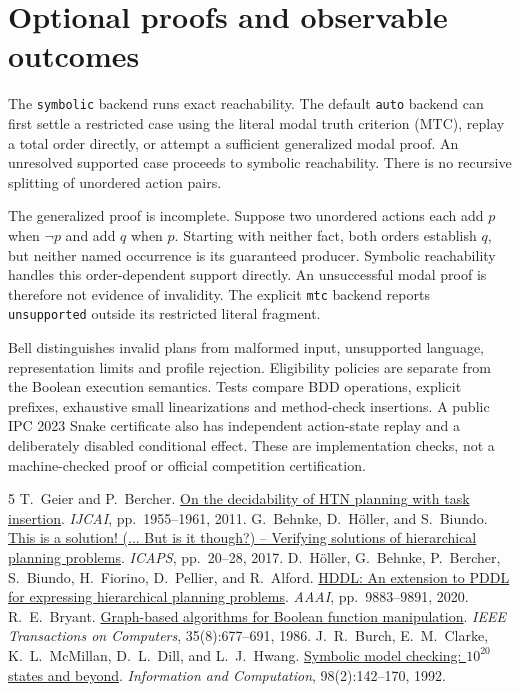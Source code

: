 \documentclass[10pt,a4paper,twocolumn]{article}
\begin{document}
\section{Optional proofs and observable outcomes}
The \texttt{symbolic} backend runs exact reachability. The default \texttt{auto}
backend can first settle a restricted case using the literal modal truth criterion
(MTC), replay a total order directly, or attempt a sufficient generalized modal proof. An unresolved supported
case proceeds to symbolic reachability. There is no recursive splitting of
unordered action pairs.

The generalized proof is incomplete. Suppose two unordered actions each add $p$
when $\neg p$ and add $q$ when $p$. Starting with neither fact, both orders
establish $q$, but neither named occurrence is its guaranteed producer. Symbolic
reachability handles this order-dependent support directly. An unsuccessful
modal proof is therefore not evidence of invalidity. The explicit \texttt{mtc}
backend reports \texttt{unsupported} outside its restricted literal fragment.

Bell distinguishes invalid plans from malformed input, unsupported language,
representation limits and profile rejection. Eligibility policies are separate
from the Boolean execution semantics. Tests compare BDD operations, explicit
prefixes, exhaustive small linearizations and method-check insertions.
A public IPC 2023 Snake certificate also has independent action-state replay
and a deliberately disabled conditional effect. These are implementation checks,
not a machine-checked proof or official competition certification.

\begin{thebibliography}{5}
\small\setlength{\itemsep}{1pt}
 T.~Geier and P.~Bercher.
\href{https://bercher.net/publications/2011/Geier2011TIHTNDecidability.pdf}{On the decidability of HTN planning with task insertion}.
\emph{IJCAI}, pp.~1955--1961, 2011.
 G.~Behnke, D.~H\"oller, and S.~Biundo.
\href{https://doi.org/10.1609/icaps.v27i1.13811}{This is a solution! (... But is it though?) -- Verifying solutions of hierarchical planning problems}.
\emph{ICAPS}, pp.~20--28, 2017.
 D.~H\"oller, G.~Behnke, P.~Bercher, S.~Biundo, H.~Fiorino, D.~Pellier, and R.~Alford.
\href{https://bercher.net/publications/2020/Hoeller2020HDDL.pdf}{HDDL: An extension to PDDL for expressing hierarchical planning problems}.
\emph{AAAI}, pp.~9883--9891, 2020.
 R.~E.~Bryant.
\href{https://doi.org/10.1109/TC.1986.1676819}{Graph-based algorithms for Boolean function manipulation}.
\emph{IEEE Transactions on Computers}, 35(8):677--691, 1986.
 J.~R.~Burch, E.~M.~Clarke, K.~L.~McMillan, D.~L.~Dill, and L.~J.~Hwang.
\href{https://doi.org/10.1016/0890-5401(92)90017-A}{Symbolic model checking: $10^{20}$ states and beyond}.
\emph{Information and Computation}, 98(2):142--170, 1992.
\end{thebibliography}
\end{document}
